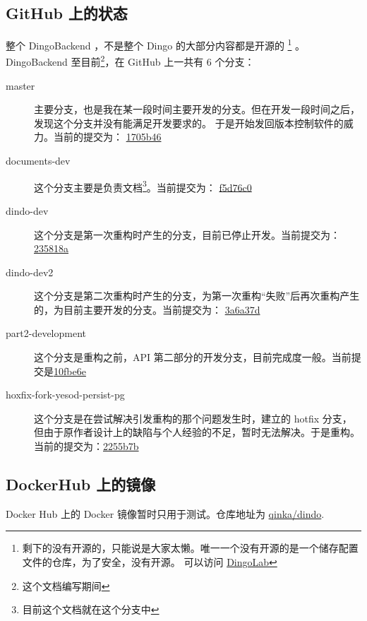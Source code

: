 \documentclass{dingo}
\begin{document}
  \subsection*{GitHub 上的状态}
    整个 DingoBackend ，不是整个 Dingo 的大部分内容都是开源的
      \footnote{剩下的没有开源的，只能说是大家太懒。唯一一个没有开源的是一个储存配置文件的仓库，为了安全，没有开源。
      可以访问 \href{https://github.com/DingoLab}{DingoLab}}
    。DingoBackend 至目前\footnote{这个文档编写期间}，在 GitHub 上一共有 6 个分支：
    \begin{description}
      \item[master] 主要分支，也是我在某一段时间主要开发的分支。但在开发一段时间之后，发现这个分支并没有能满足开发要求的。
        于是开始发回版本控制软件的威力。当前的提交为：
        \href{https://github.com/DingoLab/DingoBackend/commit/1705b461b8c2d9aa2245c2725006771ad8065995}{1705b46}
      \item[documents-dev] 这个分支主要是负责文档\footnote{目前这个文档就在这个分支中}。当前提交为：
        \href{https://github.com/DingoLab/DingoBackend/commit/f5d76c0fc408337203fc1fd54393ef41372ac4ea}{f5d76c0}
      \item[dindo-dev] 这个分支是第一次重构时产生的分支，目前已停止开发。当前提交为：
        \href{https://github.com/DingoLab/DingoBackend/commit/235818a90dff38b8276ce53233c0cdaaff7acdf0}{235818a}
      \item[dindo-dev2] 这个分支是第二次重构时产生的分支，为第一次重构“失败”后再次重构产生的，为目前主要开发的分支。当前提交为：
        \href{https://github.com/DingoLab/DingoBackend/commit/3a6a37d1183b270685cee25ad031e707e5e3b7fd}{3a6a37d}
      \item[part2-development] 这个分支是重构之前，API 第二部分的开发分支，目前完成度一般。当前提交是\href{https://github.com/DingoLab/DingoBackend/commit/10fbe6e39a8cc58e68b247423043d9b9e9012471}{10fbe6e}
      \item[hoxfix-fork-yesod-persist-pg] 这个分支是在尝试解决引发重构的那个问题发生时，建立的 hotfix 分支，但由于原作者设计上的缺陷与个人经验的不足，暂时无法解决。于是重构。
      当前的提交为：\href{https://github.com/DingoLab/DingoBackend/commit/2255b7be491450b555b5ac1f58bcb932e909bd1a}{2255b7b}
    \end{description}
    \subsection*{DockerHub 上的镜像}
      Docker Hub 上的 Docker 镜像暂时只用于测试。仓库地址为 \href{https://hub.docker.com/r/qinka/dindo/}{qinka/dindo}.
\end{document}
